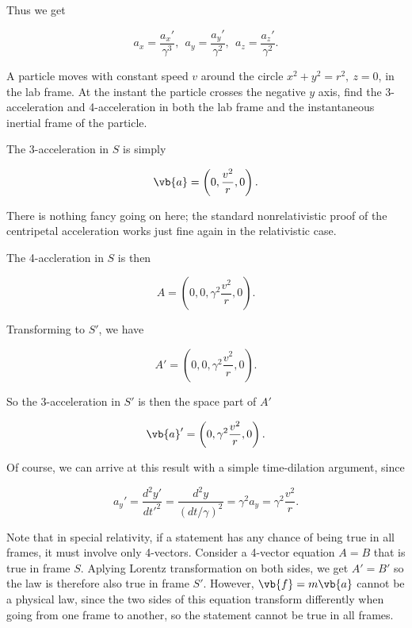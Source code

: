 \documentclass[english,a4paper,12pt]{report}
\begin{document}
Thus we get

\begin{equation}
    a_{x} = \frac{a_{x}' }{\gamma ^3 }, ~~ a_{y} = \frac{a_{y}' }{\gamma ^2}, ~~ a_{z} = \frac{a_{z}' }{\gamma ^2}.      
\end{equation}

{A particle moves with constant speed \(v\) around the circle \(x^2+y^2=r^2, ~z=0\), in the lab frame. At the instant the particle crosses the negative \(y\) axis, find the 3-acceleration and 4-acceleration in both the lab frame and the instantaneous inertial frame of the particle. }
{The 3-acceleration in \(S\) is simply

\begin{equation}
    \vb{a} = \left(0,\frac{v^2}{r}, 0 \right).
\end{equation}

There is nothing fancy going on here; the standard nonrelativistic proof of the centripetal acceleration works just fine again in the relativistic case. 

The 4-accleration in \(S\) is then 

\begin{equation}
    A = \left(0,0,\gamma ^2\frac{v^2}{r}, 0 \right).
\end{equation}

Transforming to \(S'\), we have 

\begin{equation}
    A' = \left(0,0, \gamma ^2 \frac{v^2}{r}, 0 \right).
\end{equation}

So the 3-acceleration in \(S'\) is then the space part of \(A'\)

\begin{equation}
    \vb{a} ' = \left(0,\gamma ^2\frac{v^2}{r}, 0 \right).
\end{equation}

Of course, we can arrive at this result with a simple time-dilation argument, since

\begin{equation}
    a_{y}' = \frac{d^2y'}{dt'^2} = \frac{d^2y}{(dt /\gamma ) ^2} = \gamma ^2 a_{y} = \gamma ^2 \frac{v^2}{r}.     
\end{equation}
}

Note that in special relativity, if a statement has any chance of being true in all frames, it must involve only 4-vectors. Consider a 4-vector equation \(A = B\) that is true in frame \(S\). Aplying Lorentz transformation on both sides, we get \(A' = B'\) so the law is therefore also true in frame \(S'\). However, \(\vb{f} = m\vb{a} \) cannot be a physical law, since the two sides of this equation transform differently when going from one frame to another, so the statement cannot be true in all frames. 
\end{document}
